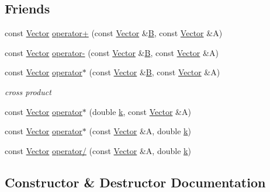 \subsection*{Friends}
\begin{DoxyCompactItemize}
\item 
const \hyperlink{class_p_c_a_1_1_vector}{Vector} \hyperlink{class_p_c_a_1_1_vector_a28f83573668a6265c637ee1c77618c84}{operator+} (const \hyperlink{class_p_c_a_1_1_vector}{Vector} \&\hyperlink{scaling_picture__new_8m_a9d3d9048db16a7eee539e93e3618cbe7}{B}, const \hyperlink{class_p_c_a_1_1_vector}{Vector} \&A)
\item 
const \hyperlink{class_p_c_a_1_1_vector}{Vector} \hyperlink{class_p_c_a_1_1_vector_a64185acd75c99c1a3a494a41098fd413}{operator-\/} (const \hyperlink{class_p_c_a_1_1_vector}{Vector} \&\hyperlink{scaling_picture__new_8m_a9d3d9048db16a7eee539e93e3618cbe7}{B}, const \hyperlink{class_p_c_a_1_1_vector}{Vector} \&A)
\item 
const \hyperlink{class_p_c_a_1_1_vector}{Vector} \hyperlink{class_p_c_a_1_1_vector_a89de706cc4a715c026fd01dbee37653c}{operator$\ast$} (const \hyperlink{class_p_c_a_1_1_vector}{Vector} \&\hyperlink{scaling_picture__new_8m_a9d3d9048db16a7eee539e93e3618cbe7}{B}, const \hyperlink{class_p_c_a_1_1_vector}{Vector} \&A)
\begin{DoxyCompactList}\small\item\em cross product \end{DoxyCompactList}\item 
const \hyperlink{class_p_c_a_1_1_vector}{Vector} \hyperlink{class_p_c_a_1_1_vector_af3d0ea67d17d9b5c985d776ed9e54bd5}{operator$\ast$} (double \hyperlink{scaling_picture__new_8m_af37276f15d333b0ba4bf3487cdae4c0d}{k}, const \hyperlink{class_p_c_a_1_1_vector}{Vector} \&A)
\item 
const \hyperlink{class_p_c_a_1_1_vector}{Vector} \hyperlink{class_p_c_a_1_1_vector_a31ae6ac45e0b6192e493d884f271a0d6}{operator$\ast$} (const \hyperlink{class_p_c_a_1_1_vector}{Vector} \&A, double \hyperlink{scaling_picture__new_8m_af37276f15d333b0ba4bf3487cdae4c0d}{k})
\item 
const \hyperlink{class_p_c_a_1_1_vector}{Vector} \hyperlink{class_p_c_a_1_1_vector_a47572e42d2d4fd6fbe0f891d61809e3b}{operator/} (const \hyperlink{class_p_c_a_1_1_vector}{Vector} \&A, double \hyperlink{scaling_picture__new_8m_af37276f15d333b0ba4bf3487cdae4c0d}{k})
\end{DoxyCompactItemize}


\subsection{Constructor \& Destructor Documentation}
\hypertarget{class_p_c_a_1_1_vector_a978077a8e59322b44add93906e551719}{}\label{class_p_c_a_1_1_vector_a978077a8e59322b44add93906e551719} 
